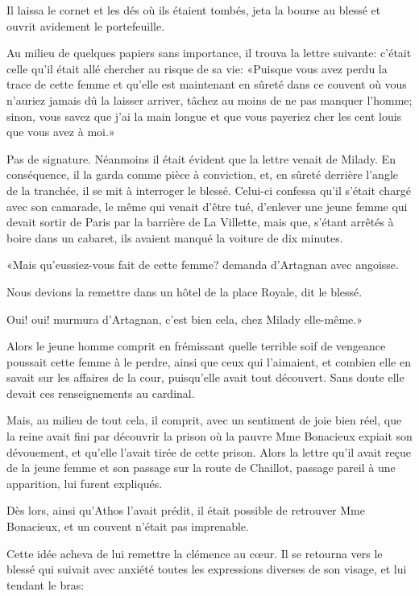 Il laissa le cornet et les dés où ils étaient tombés, jeta la bourse au blessé et ouvrit avidement le portefeuille. 

Au milieu de quelques papiers sans importance, il trouva la lettre suivante: c'était celle qu'il était allé chercher au risque de sa vie: «Puisque vous avez perdu la trace de cette femme et qu'elle est maintenant en sûreté dans ce couvent où vous n'auriez jamais dû la laisser arriver, tâchez au moins de ne pas manquer l'homme; sinon, vous savez que j'ai la main longue et que vous payeriez cher les cent louis que vous avez à moi.» 

Pas de signature. Néanmoins il était évident que la lettre venait de Milady. En conséquence, il la garda comme pièce à conviction, et, en sûreté derrière l'angle de la tranchée, il se mit à interroger le blessé. Celui-ci confessa qu'il s'était chargé avec son camarade, le même qui venait d'être tué, d'enlever une jeune femme qui devait sortir de Paris par la barrière de La Villette, mais que, s'étant arrêtés à boire dans un cabaret, ils avaient manqué la voiture de dix minutes. 

«Mais qu'eussiez-vous fait de cette femme? demanda d'Artagnan avec angoisse. 

\speak  Nous devions la remettre dans un hôtel de la place Royale, dit le blessé. 

\speak  Oui! oui! murmura d'Artagnan, c'est bien cela, chez Milady elle-même.» 

Alors le jeune homme comprit en frémissant quelle terrible soif de vengeance poussait cette femme à le perdre, ainsi que ceux qui l'aimaient, et combien elle en savait sur les affaires de la cour, puisqu'elle avait tout découvert. Sans doute elle devait ces renseignements au cardinal. 

Mais, au milieu de tout cela, il comprit, avec un sentiment de joie bien réel, que la reine avait fini par découvrir la prison où la pauvre Mme Bonacieux expiait son dévouement, et qu'elle l'avait tirée de cette prison. Alors la lettre qu'il avait reçue de la jeune femme et son passage sur la route de Chaillot, passage pareil à une apparition, lui furent expliqués. 

Dès lors, ainsi qu'Athos l'avait prédit, il était possible de retrouver Mme Bonacieux, et un couvent n'était pas imprenable. 

Cette idée acheva de lui remettre la clémence au cœur. Il se retourna vers le blessé qui suivait avec anxiété toutes les expressions diverses de son visage, et lui tendant le bras: 

